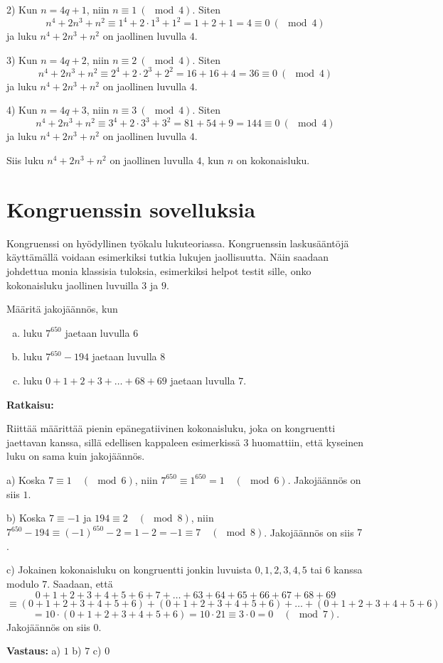 \begin{esimerkki}
2) Kun $n = 4q + 1$, niin $n \equiv 1\ (\mod 4)$. Siten
\[
n^4 + 2n^3 + n^2 \equiv 1^4 + 2 \cdot 1^3 + 1^2 = 1 + 2 + 1 = 4
\equiv 0\ (\mod 4)
\]
ja luku $n^4 + 2n^3 + n^2$ on jaollinen luvulla $4$.

3) Kun $n = 4q + 2$, niin $n \equiv 2\ (\mod 4)$. Siten
\[
n^4 + 2n^3 + n^2 \equiv 2^4 + 2 \cdot 2^3 + 2^2 = 16 + 16 + 4 =
36 \equiv 0\ (\mod 4)
\]
ja luku $n^4 + 2n^3 + n^2$ on jaollinen luvulla $4$.

4) Kun $n = 4q + 3$, niin $n \equiv 3\ (\mod 4)$. Siten
\[
n^4 + 2n^3 + n^2 \equiv 3^4 + 2 \cdot 3^3 + 3^2 = 81 + 54 + 9 =
144 \equiv 0\ (\mod 4)
\]
ja luku $n^4 + 2n^3 + n^2$ on jaollinen luvulla $4$.

Siis luku $n^4 + 2n^3 + n^2$ on jaollinen luvulla $4$, kun $n$ on
kokonaisluku.
\end{esimerkki}


\section{Kongruenssin sovelluksia}
Kongruenssi on hyödyllinen työkalu lukuteoriassa. Kongruenssin laskusääntöjä käyttämällä voidaan esimerkiksi tutkia lukujen jaollisuutta. Näin saadaan johdettua monia klassisia tuloksia, esimerkiksi helpot testit sille, onko kokonaisluku jaollinen luvuilla $3$ ja $9$.

\begin{esimerkki}
Määritä jakojäännös, kun
\begin{enumerate}[a)]
\item luku $7^{650}$ jaetaan luvulla $6$
\item luku $7^{650} - 194$ jaetaan luvulla $8$
\item luku $0+1+2+3+ \ldots + 68 + 69$ jaetaan luvulla $7$.
\end{enumerate}

{\bf Ratkaisu:}

Riittää määrittää pienin epänegatiivinen kokonaisluku, joka on kongruentti jaettavan kanssa, sillä edellisen kappaleen esimerkissä 3 huomattiin, että kyseinen luku on sama kuin jakojäännös.

a) Koska $7 \equiv 1 \quad(\mod 6)$, niin $7^{650} \equiv 1^{650} = 1 \quad (\mod 6)$. Jakojäännös on siis $1$.

b) Koska $7 \equiv -1$ ja $194 \equiv 2 \quad(\mod 8)$, niin $7^{650} - 194 \equiv (-1)^{650} - 2 = 1 - 2 = -1 \equiv 7 \quad(\mod 8)$. Jakojäännös on siis $7$.

c) Jokainen kokonaisluku on kongruentti jonkin luvuista $0, 1, 2, 3, 4, 5$ tai $6$ kanssa modulo $7$. Saadaan, että
\[
0+1+2+3+4+5+6+7+ \ldots +63+64+65+66+67+68+69
\]
\[
 \equiv (0+1+2+3+4+5+6)+(0+1+2+3+4+5+6)+ \ldots +(0+1+2+3+4+5+6)
\]
\[
=10 \cdot (0+1+2+3+4+5+6) = 10\cdot 21 \equiv 3\cdot 0 = 0 \quad(\mod 7).
\]
Jakojäännös on siis $0$.

{\bf Vastaus:} a) $1$ b) $7$ c) $0$
\end{esimerkki}

